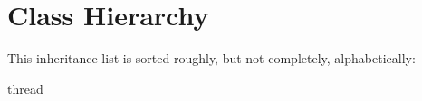 \section{Class Hierarchy}
This inheritance list is sorted roughly, but not completely, alphabetically\+:\begin{DoxyCompactList}
\item {}
\item {}
\begin{DoxyCompactList}
\item {}
\end{DoxyCompactList}
\item {}
\begin{DoxyCompactList}
\item {}
\end{DoxyCompactList}
\item thread\begin{DoxyCompactList}
\item {}
\end{DoxyCompactList}
\end{DoxyCompactList}

